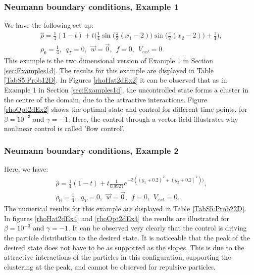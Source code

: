 \subsubsection{Neumann boundary conditions, Example 1}	
We have the following set up:
\begin{align*}
&\widehat \rho = \frac{1}{4}(1-t) + t\bigg(\frac{1}{4}\sin \bigg(\frac{\pi}{2}(x_1 - 2)\bigg)\sin \bigg(\frac{\pi}{2}(x_2 - 2)\bigg) + \frac{1}{4}\bigg),\\
&\rho_0 = \frac{1}{4},\ \
q_{T} = 0,\ \
\vec{w} = \vec{0},\ \
f =0,\ \
V_{ext} =0.
\end{align*}
This example is the two dimensional version of Example 1 in Section \ref{sec:Examples1d}. The results for this example are displayed in Table \ref{TabS5:Prob12D}. In Figures \ref{rhoHat2dEx2} it can be observed that as in Example 1 in Section \ref{sec:Examples1d}, the uncontrolled state forms a cluster in the centre of the domain, due to the attractive interactions. Figure \ref{rhoOpt2dEx2} shows the optimal state and control for different time points, for $\beta = 10^{-3}$ and $\gamma = -1$. Here, the control through a vector field illustrates why nonlinear control is called 'flow control'. 
%
%
%

\subsubsection{Neumann boundary conditions, Example 2}	
Here, we have:
\begin{align*}
&\widehat \rho = \frac{1}{4}(1-t) + t\frac{1}{0.9921}e^{-3((y_1+0.2)^2 + (y_2+0.2)^2))},\\
&\rho_0 = \frac{1}{4},\ \
q_{T} = 0,\ \
\vec{w} = \vec{0},\ \
f =0,\ \
V_{ext} =0.
\end{align*}
The numerical results for this example are displayed in Table \ref{TabS5:Prob22D}. In figures \ref{rhoHat2dEx4} and \ref{rhoOpt2dEx4} the results are illustrated for $\beta = 10^{-3}$ and $\gamma = -1$. It can be observed very clearly that the control is driving the particle distribution to the desired state. It is noticeable that the peak of the desired state does not have to be as supported as the slopes. This is due to the attractive interactions of the particles in this configuration, supporting the clustering at the peak, and cannot be observed for repulsive particles.

